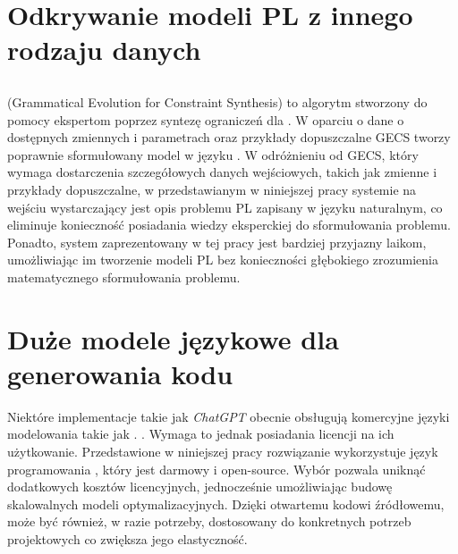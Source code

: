 \section{Odkrywanie modeli PL z innego rodzaju danych}
\subsection*{ \cite{pawlak2021grammatical}}
 (Grammatical Evolution for Constraint Synthesis) to algorytm stworzony do pomocy ekspertom poprzez syntezę ograniczeń dla . W oparciu o dane o dostępnych zmiennych i parametrach oraz przykłady dopuszczalne  GECS tworzy poprawnie sformułowany model  w języku . W odróżnieniu od GECS, który wymaga dostarczenia szczegółowych danych wejściowych, takich jak zmienne i przykłady dopuszczalne, w przedstawianym w niniejszej pracy systemie na wejściu wystarczający jest opis problemu PL zapisany w języku naturalnym, co eliminuje konieczność posiadania wiedzy eksperckiej do sformułowania problemu. Ponadto, system zaprezentowany w tej pracy jest bardziej przyjazny laikom, umożliwiając im tworzenie modeli PL bez konieczności głębokiego zrozumienia matematycznego sformułowania problemu.


\section{Duże modele językowe dla generowania kodu}
Niektóre implementacje  takie jak \textit{ChatGPT} obecnie obsługują komercyjne języki modelowania takie jak . \cite{ampl_chatgpt_guide}. Wymaga to jednak posiadania licencji na ich użytkowanie. Przedstawione w niniejszej pracy rozwiązanie wykorzystuje język programowania , który jest darmowy i open-source. Wybór  pozwala uniknąć dodatkowych kosztów licencyjnych, jednocześnie umożliwiając budowę skalowalnych modeli optymalizacyjnych. Dzięki otwartemu kodowi źródłowemu,  może być również, w razie potrzeby, dostosowany do konkretnych potrzeb projektowych co zwiększa jego elastyczność.







